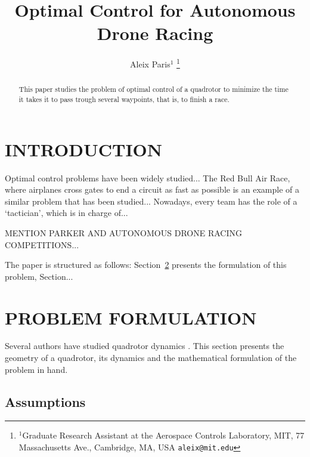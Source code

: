 \documentclass[letterpaper, 10 pt, conference]{ieeeconf}  %
\title{\LARGE \bf
Optimal Control for Autonomous Drone Racing
}
\author{Aleix Paris$^{1}$%
\thanks{$^{1}$Graduate Research Assistant at the Aerospace Controls Laboratory,
        MIT, 77 Massachusetts Ave., Cambridge, MA, USA
        {\tt\small aleix@mit.edu}}%
}
\begin{document}
\maketitle
\thispagestyle{empty}
\pagestyle{empty}


\begin{abstract}

This paper studies the problem of optimal control of a quadrotor to minimize the time it takes it to pass trough several waypoints, that is, to finish a race.

\end{abstract}


\section{INTRODUCTION}\label{s:intro}

Optimal control problems have been widely studied...
The Red Bull Air Race, where airplanes cross gates to end a circuit as fast as possible is an example of a similar problem that has been studied... Nowadays, every team has the role of a `tactician', which is in charge of...

MENTION PARKER AND AUTONOMOUS DRONE RACING COMPETITIONS...

The paper is structured as follows: Section~\ref{s:problem} presents the formulation of this problem, Section...


\section{PROBLEM FORMULATION}\label{s:problem}

Several authors have studied quadrotor dynamics \cite{IEEEexample:article_typical}. %
This section presents the geometry of a quadrotor, its dynamics and the mathematical formulation of the problem in hand.

\subsection{Assumptions}
\end{document}
